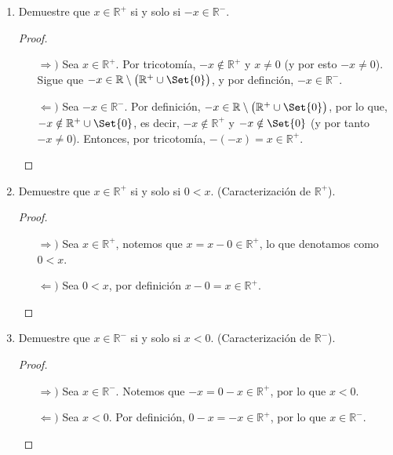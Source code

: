 \documentclass[11pt]{article}
\newcommand{\R}{\mathbb{R}}
\let\set\Set
\let\union\cup
\begin{document}
\begin{enumerate}[label=\alph*)]
    \item Demuestre que $x\in \R^+$ si y solo si $-x\in \R^-$.
    \vspace{-1em}
    \begin{proof}\leavevmode
    \begin{itemize}
    \item[$\Rightarrow)$] Sea $x\in \R^+$. Por tricotomía, $-x\notin \R^+$ y $x\neq 0$ (y por esto $-x\neq 0$). Sigue que $-x\in \R\setminus \bigl(\R^+\union \set{0}\bigr)$, y por definción, $-x\in \R^-$.
    \item[$\Leftarrow)$] Sea $-x\in \R^-$. Por definición, $-x\in \R\setminus\bigl(\R^+\union \set{0}\bigr)$, por lo que, $-x\notin \R^+\union \set{0}$, es decir, $-x\notin \R^+$ y $-x\notin \set{0}$ (y por tanto $-x\neq 0$). Entonces, por tricotomía, $-(-x)=x\in \R^+$. \qedhere
    \end{itemize}
    \end{proof} \vspace{-1em}

    \item Demuestre que $x\in \R^+$ si y solo si $0<x$. (Caracterización de $\R^+$).
    \vspace{-1em}
    \begin{proof}\leavevmode
    \begin{itemize}
    \item[$\Rightarrow)$] Sea $x\in \R^+$, notemos que $x=x-0\in \R^+$, lo que denotamos como $0<x$.
    \item[$\Leftarrow)$] Sea $0<x$, por definición $x-0=x\in \R^+$. \qedhere
    \end{itemize}
    \end{proof} \vspace{-1em}

    \item Demuestre que $x\in \R^-$ si y solo si $x<0$. (Caracterización de $\R^-$).
    \vspace{-1em}
    \begin{proof}\leavevmode
    \begin{itemize}
    \item[$\Rightarrow)$] Sea $x\in \R^-$. Notemos que $-x=0-x\in \R^+$, por lo que $x<0$.
    \item[$\Leftarrow)$] Sea $x<0$. Por definición, $0-x=-x\in \R^+$, por lo que $x\in \R^-$. \qedhere
    \end{itemize}
    \end{proof} \vspace{-1em}
\end{enumerate}
\end{document}
